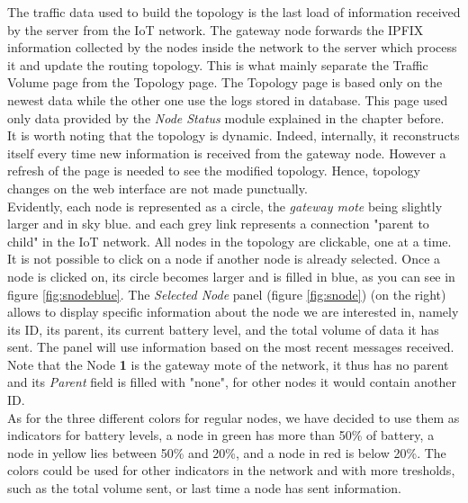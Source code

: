 The traffic data used to build the topology is the last load of information received by the server from the IoT network. The gateway node forwards the IPFIX information collected by the nodes inside the network to the server which process it and update the routing topology. This is what mainly separate the Traffic Volume page from the Topology page. The Topology page is based only on the newest data while the other one use the logs stored in database. This page used only data provided by the \textit{Node Status} module explained in the chapter before.\\

It is worth noting that the topology is dynamic. Indeed, internally, it reconstructs itself every time new information is received from the gateway node. However a refresh of the page is needed to see the modified topology. Hence, topology changes on the web interface are not made punctually. \\

Evidently, each node is represented as a circle, the \textit{gateway mote} being slightly larger and in sky blue. and each grey link represents a connection "parent to child" in the IoT network. All nodes in the topology are clickable, one at a time. It is not possible to click on a node if another node is already selected. Once a node is clicked on, its circle becomes larger and is filled in blue, as you can see in figure \ref{fig:snodeblue}. The \textit{Selected Node} panel (figure \ref{fig:snode}) (on the right) allows to display specific information about the node we are interested in, namely its ID, its parent, its current battery level, and the total volume of data it has sent. The panel will use information based on the most recent messages received. Note that the Node \textbf{1} is the gateway mote of the network, it thus has no parent and its \textit{Parent} field is filled with "none", for other nodes it would contain another ID.\\

As for the three different colors for regular nodes, we have decided to use them as indicators for battery levels, a node in green has more than 50\% of battery, a node in yellow lies between 50\% and 20\%, and a node in red is below 20\%. The colors could be used for other indicators in the network and with more tresholds, such as the total volume sent, or last time a node has sent information.\\

